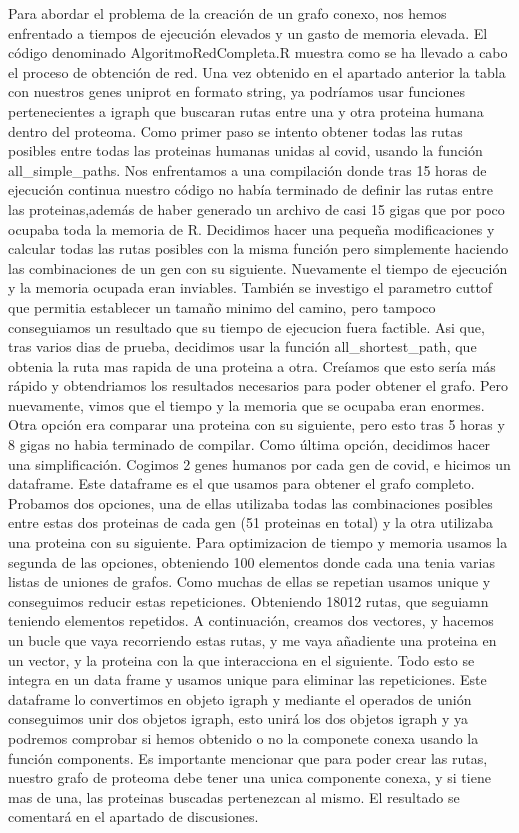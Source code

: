 Para abordar el problema de la creación de un grafo conexo, nos hemos enfrentado a tiempos de ejecución elevados y un gasto de memoria elevada. 
El código denominado AlgoritmoRedCompleta.R muestra como se ha llevado a cabo el proceso de obtención de red. 
Una vez obtenido en el apartado anterior la tabla con nuestros genes uniprot en formato string, ya podríamos usar funciones pertenecientes a igraph que buscaran rutas entre una y otra proteina humana dentro del proteoma. 
Como primer paso se intento obtener todas las rutas posibles entre todas las proteinas humanas unidas al covid, usando la función all_simple_paths. 
Nos enfrentamos a una compilación donde tras 15 horas de ejecución continua nuestro código no había terminado de definir las rutas entre las proteinas,además de haber generado un archivo de casi 15 gigas que por poco ocupaba toda la memoria de R. 
Decidimos hacer una pequeña modificaciones y calcular todas las rutas posibles con la misma función pero simplemente haciendo las combinaciones de un gen con su siguiente. Nuevamente el tiempo de ejecución y la memoria ocupada eran inviables. 
También se investigo el parametro cuttof que permitia establecer un tamaño minimo del camino, pero tampoco conseguiamos un resultado que su tiempo de ejecucion fuera factible. 
Asi que, tras varios dias de prueba, decidimos usar la función all_shortest_path, que obtenia la ruta mas rapida de una proteina a otra. Creíamos que esto sería más rápido y obtendriamos los resultados necesarios para poder obtener el grafo. Pero nuevamente, vimos que el tiempo y la memoria que se ocupaba eran enormes. Otra opción era comparar una proteina con su siguiente, pero esto tras 5 horas y 8 gigas no habia terminado de compilar. 
Como última opción, decidimos hacer una simplificación. Cogimos 2 genes humanos por cada gen de covid, e hicimos un dataframe. Este dataframe es el que usamos para obtener el grafo completo. 
Probamos dos opciones, una de ellas utilizaba todas las combinaciones posibles entre estas dos proteinas de cada gen (51 proteinas en total) y la otra utilizaba una proteina con su siguiente. Para optimizacion de tiempo y memoria usamos la segunda de las opciones, obteniendo 100 elementos donde cada una tenia varias listas de uniones de grafos. Como muchas de ellas se repetian usamos unique y conseguimos reducir estas repeticiones. Obteniendo 18012 rutas, que seguiamn teniendo elementos repetidos. A continuación, creamos dos vectores, y hacemos un bucle que vaya recorriendo estas rutas, y me vaya añadiente una proteina en un vector, y la proteina con la que interacciona en el siguiente. Todo esto se integra en un data frame y usamos unique para eliminar las repeticiones. 
Este dataframe lo convertimos en objeto igraph y mediante el operados de unión conseguimos unir dos objetos igraph, esto unirá los dos objetos igraph y ya podremos comprobar si hemos obtenido o no la componete conexa usando la función components. Es importante mencionar que para poder crear las rutas, nuestro grafo de proteoma debe tener una unica componente conexa, y si tiene mas de una, las proteinas buscadas pertenezcan al mismo. El resultado se comentará en el apartado de discusiones. 

